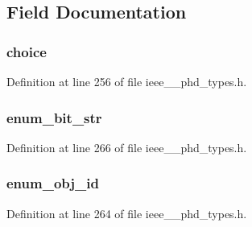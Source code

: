 \subsection{Field Documentation}
\hypertarget{struct___enum_val_a034761fd73babd925f56cbb254ce4fb2}{}
\subsubsection[{choice}]{ choice}\label{struct___enum_val_a034761fd73babd925f56cbb254ce4fb2}


Definition at line 256 of file ieee\+\_\+\_\+phd\+\_\+types.\+h.

\hypertarget{struct___enum_val_aa58b7fc28d562df902f32bc0007d3f7f}{}
\subsubsection[{enum\+\_\+bit\+\_\+str}]{ enum\+\_\+bit\+\_\+str}\label{struct___enum_val_aa58b7fc28d562df902f32bc0007d3f7f}


Definition at line 266 of file ieee\+\_\+\_\+phd\+\_\+types.\+h.

\hypertarget{struct___enum_val_af27a89b9e915ac703bba2f71e8e229d7}{}
\subsubsection[{enum\+\_\+obj\+\_\+id}]{ enum\+\_\+obj\+\_\+id}\label{struct___enum_val_af27a89b9e915ac703bba2f71e8e229d7}


Definition at line 264 of file ieee\+\_\+\_\+phd\+\_\+types.\+h.

\hypertarget{struct___enum_val_acdf1fca8a0a0e3269df2cba7026aa241}{}
